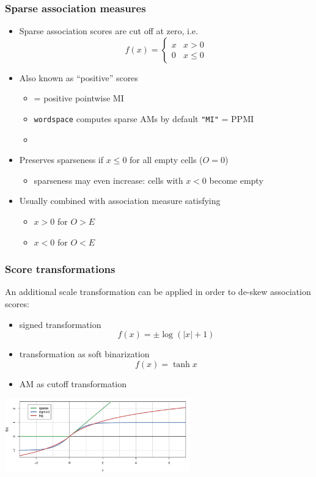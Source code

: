 \documentclass[t]{beamer} %
\begin{document}
\begin{frame}
  \frametitle{Sparse association measures}

  \begin{itemize}
  \item Sparse association scores are cut off at zero, i.e.\
    \[
    f(x) =
    \begin{cases}
      x & x > 0 \\
      0 & x \leq 0
    \end{cases}
    \]
  \item Also known as ``positive'' scores
    \begin{itemize}
    \item {} = positive pointwise MI \citep[e.g.][]{Bullinaria:Levy:07}
    \item \texttt{wordspace} computes sparse AMs by default \so \texttt{"MI"} = PPMI
    \item[]
    \end{itemize}
  \item<2-> Preserves sparseness if $x \leq 0$ for all empty cells ($O = 0$)
    \begin{itemize}
    \item sparseness may even increase: cells with $x < 0$ become empty
    \end{itemize}
  \item<2-> Usually combined with  association measure satisfying
    \begin{itemize}
    \item $x > 0$ for $O > E$
    \item $x < 0$ for $O < E$
    \end{itemize}
  \end{itemize}
\end{frame}

\begin{frame}
  \frametitle{Score transformations}

  \ungap[1]
  An additional scale transformation can be applied in order to de-skew association scores:
  \begin{itemize}
  \item<2-> signed  transformation
    \[
    f(x) = \pm \log(|x| + 1)
    \] 
  \item<3->  transformation as soft binarization
    \[
    f(x) = \tanh x
    \]
  \item<4-> AM as cutoff transformation
  \end{itemize}

  \begin{center}
    \includegraphics[width=8cm]{img/transformation_functions}
  \end{center}
\end{frame}
\end{document}
